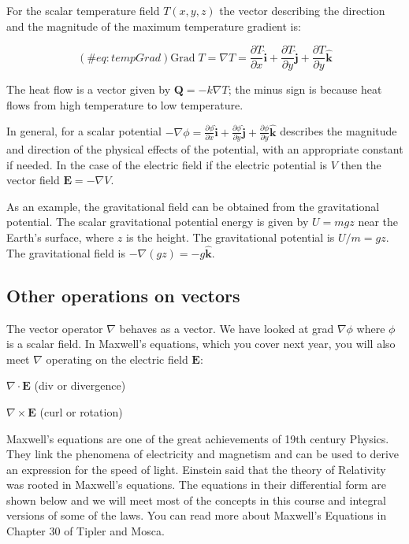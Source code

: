 \documentclass[
  letterpaper,
  DIV=11,
  numbers=noendperiod]{scrreprt}
\begin{document}
For the scalar temperature field \(T(x,y,z)\) the vector describing the
direction and the magnitude of the maximum temperature gradient is:

\begin{equation}
(\#eq:tempGrad)
 \text{Grad} \; T = \nabla T = \frac{\partial T} {\partial x} \hat{\mathbf{i}} + \frac{\partial T}{\partial y} \hat{\mathbf{j}} + \frac{\partial T}{\partial y} \hat{\mathbf{k}}
\end{equation}

The heat flow is a vector given by \(\mathbf{Q} = -k \nabla T\); the
minus sign is because heat flows from high temperature to low
temperature.

In general, for a scalar potential
\(-\nabla \phi = \frac{\partial \phi} {\partial x} \hat{\mathbf{i}} + \frac{\partial \phi}{\partial y} \hat{\mathbf{j}} + \frac{\partial \phi}{\partial y} \hat{\mathbf{k}}\)
describes the magnitude and direction of the physical effects of the
potential, with an appropriate constant if needed. In the case of the
electric field if the electric potential is \(V\) then the vector field
\(\mathbf{E} = -\nabla V\).

As an example, the gravitational field can be obtained from the
gravitational potential. The scalar gravitational potential energy is
given by \(U = mgz\) near the Earth's surface, where \(z\) is the
height. The gravitational potential is \(U/m = gz\). The gravitational
field is \(-\nabla(gz)=-g \hat{\mathbf{k}}\).

\subsection{Other operations on
vectors}\label{other-operations-on-vectors}

The vector operator \(\nabla\) behaves as a vector. We have looked at
grad \(\nabla\phi\) where \(\phi\) is a scalar field. In Maxwell's
equations, which you cover next year, you will also meet \(\nabla\)
operating on the electric field \(\mathbf{E}\):

\(\nabla \cdot \mathbf{E}\) (div or divergence)

\(\nabla \times \mathbf{E}\) (curl or rotation)

Maxwell's equations are one of the great achievements of 19th century
Physics. They link the phenomena of electricity and magnetism and can be
used to derive an expression for the speed of light. Einstein said that
the theory of Relativity was rooted in Maxwell's equations. The
equations in their differential form are shown below and we will meet
most of the concepts in this course and integral versions of some of the
laws. You can read more about Maxwell's Equations in Chapter 30 of
Tipler and Mosca.
\end{document}
